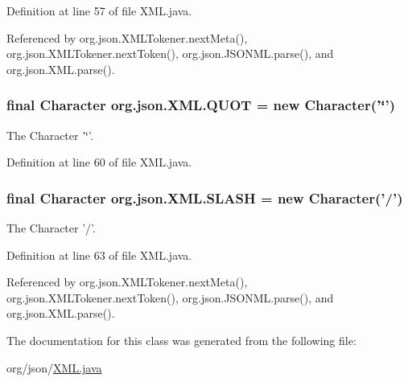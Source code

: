 Definition at line 57 of file X\-M\-L.\-java.



Referenced by org.\-json.\-X\-M\-L\-Tokener.\-next\-Meta(), org.\-json.\-X\-M\-L\-Tokener.\-next\-Token(), org.\-json.\-J\-S\-O\-N\-M\-L.\-parse(), and org.\-json.\-X\-M\-L.\-parse().

\hypertarget{classorg_1_1json_1_1_x_m_l_a4a8e56f228505f24fd24b70914d5078c}{
\subsubsection[{Q\-U\-O\-T}]{\setlength{\rightskip}{0pt plus 5cm}final Character org.\-json.\-X\-M\-L.\-Q\-U\-O\-T = new Character('\char`\"{}')\hspace{0.3cm}{\ttfamily [static]}}}\label{classorg_1_1json_1_1_x_m_l_a4a8e56f228505f24fd24b70914d5078c}
The Character '\char`\"{}'. 

Definition at line 60 of file X\-M\-L.\-java.

\hypertarget{classorg_1_1json_1_1_x_m_l_aaa9a255bc94655b02d65b2c8525e5188}{
\subsubsection[{S\-L\-A\-S\-H}]{\setlength{\rightskip}{0pt plus 5cm}final Character org.\-json.\-X\-M\-L.\-S\-L\-A\-S\-H = new Character('/')\hspace{0.3cm}{\ttfamily [static]}}}\label{classorg_1_1json_1_1_x_m_l_aaa9a255bc94655b02d65b2c8525e5188}
The Character '/'. 

Definition at line 63 of file X\-M\-L.\-java.



Referenced by org.\-json.\-X\-M\-L\-Tokener.\-next\-Meta(), org.\-json.\-X\-M\-L\-Tokener.\-next\-Token(), org.\-json.\-J\-S\-O\-N\-M\-L.\-parse(), and org.\-json.\-X\-M\-L.\-parse().



The documentation for this class was generated from the following file\-:\begin{DoxyCompactItemize}
\item 
org/json/\hyperlink{_x_m_l_8java}{X\-M\-L.\-java}\end{DoxyCompactItemize}
